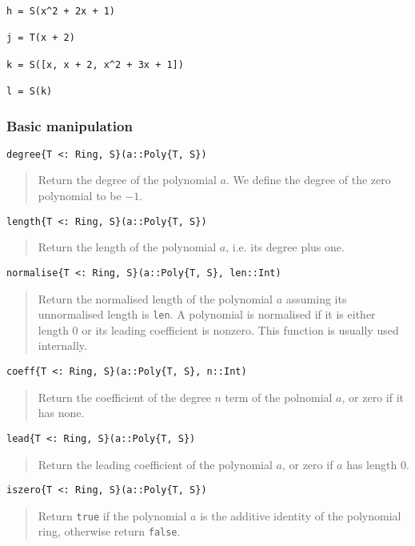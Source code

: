 \documentclass[a4paper,10pt]{article}
\newcommand{\code}{\lstinline}
\newcommand{\desc}[1]{\vspace{-3mm}\begin{quote}#1\end{quote}}
\begin{document}
{{\begin{lstlisting}
h = S(x^2 + 2x + 1)

j = T(x + 2)

k = S([x, x + 2, x^2 + 3x + 1])

l = S(k)
\end{lstlisting}

\subsubsection{Basic manipulation}

\begin{lstlisting}
degree{T <: Ring, S}(a::Poly{T, S})
\end{lstlisting}

\desc{Return the degree of the polynomial $a$. We define the degree of the zero
polynomial to be $-1$.}

\begin{lstlisting}
length{T <: Ring, S}(a::Poly{T, S})
\end{lstlisting}

\desc{Return the length of the polynomial $a$, i.e. its degree plus one.}

\begin{lstlisting}
normalise{T <: Ring, S}(a::Poly{T, S}, len::Int)
\end{lstlisting}

\desc{Return the normalised length of the polynomial $a$ assuming its unnormalised
length is \code{len}. A polynomial is normalised if it is either length $0$ or its
leading coefficient is nonzero. This function is usually used internally.}

\begin{lstlisting}
coeff{T <: Ring, S}(a::Poly{T, S}, n::Int)
\end{lstlisting}

\desc{Return the coefficient of the degree $n$ term of the polnomial $a$, or zero
if it has none.}

\begin{lstlisting}
lead{T <: Ring, S}(a::Poly{T, S})
\end{lstlisting}

\desc{Return the leading coefficient of the polynomial $a$, or zero if $a$ has
length $0$.}

\begin{lstlisting}
iszero{T <: Ring, S}(a::Poly{T, S})
\end{lstlisting}

\desc{Return \code{true} if the polynomial $a$ is the additive identity of the
polynomial ring, otherwise return \code{false}.}

}}
\end{document}
